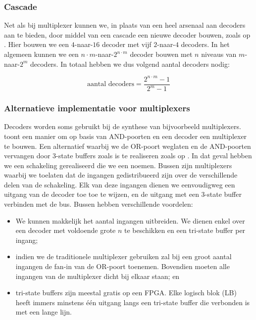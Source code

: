 \subsubsection{Cascade}
Net als bij multiplexer kunnen we, in plaats van een heel arsenaal aan decoders aan te bieden, door middel van een cascade een nieuwe decoder bouwen, zoals op . Hier bouwen we een $4$-naar-$16$ decoder met vijf $2$-naar-$4$ decoders. In het algemeen kunnen we een $n\cdot m$-naar-$2^{n\cdot m}$ decoder bouwen met $n$ niveaus van $m$-naar-$2^m$ decoders. In totaal hebben we dus volgend aantal decoders nodig:

\begin{equation}
\mbox{aantal decoders}=\displaystyle\frac{2^{n\cdot m}-1}{2^m-1}
\end{equation}

\subsubsection{Alternatieve implementatie voor multiplexers}
Decoders worden soms gebruikt bij de synthese van bijvoorbeeld multiplexers.  toont een manier om op basis van AND-poorten en een decoder een multiplexer te bouwen. Een alternatief waarbij we de OR-poort weglaten en de AND-poorten vervangen door 3-state buffers zoals is te realiseren zoals op . In dat geval hebben we een schakeling gerealiseerd die we een  noemen. Bussen zijn multiplexers waarbij we toelaten dat de ingangen gedistribueerd zijn over de verschillende delen van de schakeling. Elk van deze ingangen dienen we eenvoudigweg een uitgang van de decoder toe toe te wijzen, en de uitgang met een 3-state buffer verbinden met de bus. Bussen hebben verschillende voordelen:
\begin{itemize}
 \item We kunnen makkelijk het aantal ingangen uitbreiden. We dienen enkel over een decoder met voldoende grote $n$ te beschikken en een tri-state buffer per ingang;
 \item indien we de traditionele multiplexer gebruiken zal bij een groot aantal ingangen de fan-in van de OR-poort toenemen. Bovendien moeten alle ingangen van de multiplexer dicht bij elkaar staan; en
 \item tri-state buffers zijn meestal gratis op een FPGA. Elke logisch blok (LB) heeft immers minstens \'e\'en uitgang langs een tri-state buffer die verbonden is met een lange lijn.
\end{itemize}

